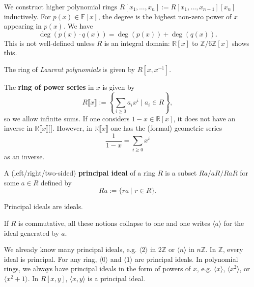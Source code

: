 We construct higher polynomial rings $R[x_1, \dots, x_n]:=R[x_1, \dots, x_{n-1}][x_n]$ inductively. For $p(x)\in \mathbb{F}[x]$, the degree is the highest non-zero power of $x$ appearing in $p(x)$. We have \[
\deg(p(x)\cdot q(x))=\deg(p(x))+\deg(q(x))
.\]  This is not well-defined unless $R$ is an integral domain: $\mathbb{R}[x]$ to $\mathbb{Z}/6\mathbb{Z}[x]$ shows this.
\begin{eg}
    The ring of \emph{Laurent polynomials} is given by $R[x,x^{-1}]$.
\end{eg}
\begin{eg}
    The \textbf{ring of power series} in $x$ is given by \[
        R\llbracket x \rrbracket:=\left\{ \sum_{i \geq 0}a_ix^i \mid a_i \in R \right\}
    ,\] so we allow infinite sums. If one considers $1-x \in \mathbb{R}[x]$, it does not have an inverse in $\mathbb{R}\llbracket x \rrbracket]]$. However, in $\mathbb{R}\llbracket x \rrbracket$ one has the (formal) geometric series \[
    \frac{1}{1-x} = \sum_{i \geq 0} x^i
    \] as an inverse.
\end{eg}
\begin{definition}
    A (left/right/two-sided) \textbf{principal ideal} of a ring $R$ is a subset $Ra / aR / RaR$ for some $a \in R$ defined by \[
        Ra:= \{ ra \mid r \in R \}
    .\] 
\end{definition}
\begin{ex}
    Principal ideals are ideals.
\end{ex}
\begin{remark}
   If $R$ is commutative, all these notions collapse to one and one writes $\langle a \rangle$ for the ideal generated by $a$. 
\end{remark}
\begin{eg}
We already know many principal ideals, e.g. $\langle 2 \rangle$ in $2\mathbb{Z}$ or $\langle n \rangle$ in $n \mathbb{Z}$. In $\mathbb{Z}$, every ideal is principal. For any ring, $\langle 0 \rangle$ and $\langle 1 \rangle$ are principal ideals. In polynomial rings, we always have principal ideals in the form of powers of $x$, e.g. $\langle x \rangle$, $\langle x^2 \rangle$, or $\langle x^2+1 \rangle$.  In $R[x,y]$, $\langle x,y \rangle$ is a principal ideal.
\end{eg}
